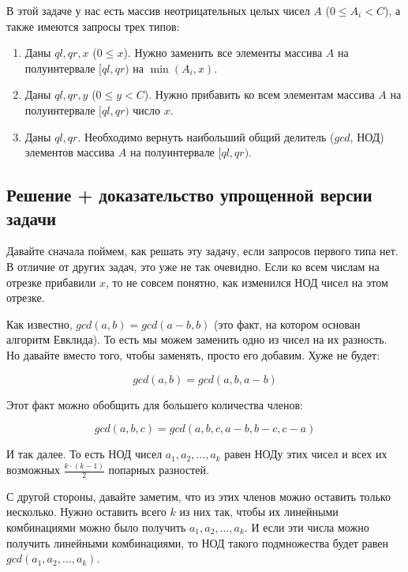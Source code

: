 В этой задаче у нас есть массив неотрицательных целых чисел $A$ ($0 \le A_i < C$), а также имеются запросы трех типов:

\begin{enumerate}
    \item Даны $ql, qr, x$ ($0 \le x$). Нужно заменить все элементы массива $A$ на полуинтервале $[ql, qr)$ на $\min(A_i, x)$.
    \item Даны $ql, qr, y$ ($0 \le y < C$). Нужно прибавить ко всем элементам массива $A$ на полуинтервале $[ql, qr)$ число $x$.
    \item Даны $ql, qr$. Необходимо вернуть наибольший общий делитель ($gcd$, НОД) элементов массива $A$ на полуинтервале $[ql, qr)$.
\end{enumerate}

\subsection{Решение + доказательство упрощенной версии задачи}

Давайте сначала поймем, как решать эту задачу, если запросов первого типа нет. В отличие от других задач, это уже не так очевидно. Если ко всем числам на отрезке прибавили $x$, то не совсем понятно, как изменился НОД чисел на этом отрезке.

Как известно, $gcd(a, b) = gcd(a - b, b)$ (это факт, на котором основан алгоритм Евклида). То есть мы можем заменить одно из чисел на их разность. Но давайте вместо того, чтобы заменять, просто его добавим. Хуже не будет:

$$gcd(a, b) = gcd(a, b, a - b)$$

Этот факт можно обобщить для большего количества членов:

$$gcd(a, b, c) = gcd(a, b, c, a - b, b - c, c - a)$$

И так далее. То есть НОД чисел $a_1, a_2, \ldots, a_k$ равен НОДу этих чисел и всех их возможных $\frac{k \cdot (k - 1)}{2}$ попарных разностей.

С другой стороны, давайте заметим, что из этих членов можно оставить только несколько. Нужно оставить всего  $k$ из них так, чтобы их линейными комбинациями можно было получить $a_1, a_2, \ldots, a_k$. И если эти числа можно получить линейными комбинациями, то НОД такого подмножества будет равен $gcd(a_1, a_2, \ldots, a_k)$.

